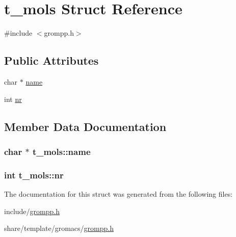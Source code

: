 \hypertarget{structt__mols}{\section{t\-\_\-mols \-Struct \-Reference}
\label{structt__mols}
}


{\ttfamily \#include $<$grompp.\-h$>$}

\subsection*{\-Public \-Attributes}
\begin{DoxyCompactItemize}
\item 
char $\ast$ \hyperlink{structt__mols_a298df7ae4494b02cfea1d87955aaa1d2}{name}
\item 
int \hyperlink{structt__mols_a536aa211316348ce6aa359941194ce3d}{nr}
\end{DoxyCompactItemize}


\subsection{\-Member \-Data \-Documentation}
\hypertarget{structt__mols_a298df7ae4494b02cfea1d87955aaa1d2}{
\subsubsection[{name}]{\setlength{\rightskip}{0pt plus 5cm}char $\ast$ {\bf t\-\_\-mols\-::name}}}\label{structt__mols_a298df7ae4494b02cfea1d87955aaa1d2}
\hypertarget{structt__mols_a536aa211316348ce6aa359941194ce3d}{
\subsubsection[{nr}]{\setlength{\rightskip}{0pt plus 5cm}int {\bf t\-\_\-mols\-::nr}}}\label{structt__mols_a536aa211316348ce6aa359941194ce3d}


\-The documentation for this struct was generated from the following files\-:\begin{DoxyCompactItemize}
\item 
include/\hyperlink{include_2grompp_8h}{grompp.\-h}\item 
share/template/gromacs/\hyperlink{share_2template_2gromacs_2grompp_8h}{grompp.\-h}\end{DoxyCompactItemize}
